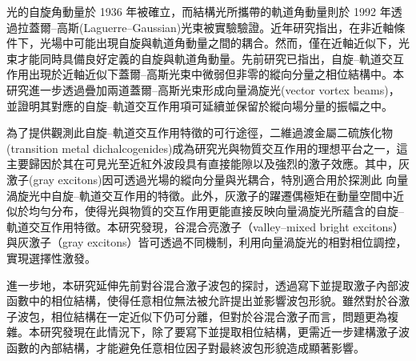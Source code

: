 
\begin{zhAbstract}
光的自旋角動量於 1936 年被確立，而結構光所攜帶的軌道角動量則於 1992 年透過拉蓋爾–高斯(Laguerre–Gaussian)光束被實驗驗證。近年研究指出，在非近軸條件下，光場中可能出現自旋與軌道角動量之間的耦合。然而，僅在近軸近似下，光束才能同時具備良好定義的自旋與軌道角動量。先前研究已指出，自旋–軌道交互作用出現於近軸近似下蓋爾–高斯光束中微弱但非零的縱向分量之相位結構中。本研究進一步透過疊加兩道蓋爾–高斯光束形成向量渦旋光(vector vortex beams)，並證明其對應的自旋–軌道交互作用項可延續並保留於縱向場分量的振幅之中。

為了提供觀測此自旋–軌道交互作用特徵的可行途徑，二維過渡金屬二硫族化物(transition metal dichalcogenides)成為研究光與物質交互作用的理想平台之一，這主要歸因於其在可見光至近紅外波段具有直接能隙以及強烈的激子效應。其中，灰激子(gray excitons)因可透過光場的縱向分量與光耦合，特別適合用於探測此 向量渦旋光中自旋–軌道交互作用的特徵。此外，灰激子的躍遷偶極矩在動量空間中近似於均勻分布，使得光與物質的交互作用更能直接反映向量渦旋光所蘊含的自旋–軌道交互作用特徵。本研究發現，谷混合亮激子（valley–mixed bright excitons）與灰激子（gray excitons）皆可透過不同機制，利用向量渦旋光的相對相位調控，實現選擇性激發。

進一步地，本研究延伸先前對谷混合激子波包的探討，透過寫下並提取激子內部波函數中的相位結構，使得任意相位無法被允許提出並影響波包形貌。雖然對於谷激子波包，相位結構在一定近似下仍可分離，但對於谷混合激子而言，問題更為複雜。本研究發現在此情況下，除了要寫下並提取相位結構，更需近一步建構激子波函數的內部結構，才能避免任意相位因子對最終波包形貌造成顯著影響。
    \zhAbsKeywords
\end{zhAbstract}
